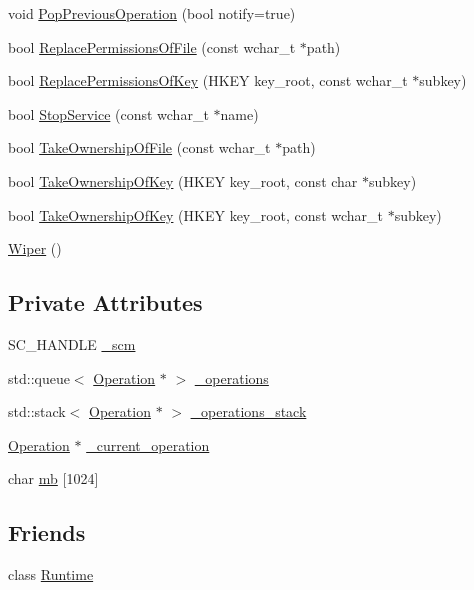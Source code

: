 \begin{DoxyCompactItemize}
void \hyperlink{class_wiper_a00e8df6a911cf4a6680a382e19b44396}{Pop\-Previous\-Operation} (bool notify=true)
\item 
bool \hyperlink{class_wiper_adda0b8c48ff6a104deacd17ae11ecd81}{Replace\-Permissions\-Of\-File} (const wchar\-\_\-t $\ast$path)
\item 
bool \hyperlink{class_wiper_a96dff12b4ab8a075098e08e7f21e4357}{Replace\-Permissions\-Of\-Key} (H\-K\-E\-Y key\-\_\-root, const wchar\-\_\-t $\ast$subkey)
\item 
bool \hyperlink{class_wiper_a6dcb5ad961fe3403cde2783a75460172}{Stop\-Service} (const wchar\-\_\-t $\ast$name)
\item 
bool \hyperlink{class_wiper_a044fdff304d6e27ecd8643c89e99f234}{Take\-Ownership\-Of\-File} (const wchar\-\_\-t $\ast$path)
\item 
bool \hyperlink{class_wiper_aa6d779022f6b2b4d06734f089a82e46e}{Take\-Ownership\-Of\-Key} (H\-K\-E\-Y key\-\_\-root, const char $\ast$subkey)
\item 
bool \hyperlink{class_wiper_a27e7a3905abc6414d2d1f180e8f3844b}{Take\-Ownership\-Of\-Key} (H\-K\-E\-Y key\-\_\-root, const wchar\-\_\-t $\ast$subkey)
\item 
\hyperlink{class_wiper_a99987a7b4100b4781fb825f238facf17}{Wiper} ()
\end{DoxyCompactItemize}
\subsection*{Private Attributes}
\begin{DoxyCompactItemize}
\item 
S\-C\-\_\-\-H\-A\-N\-D\-L\-E \hyperlink{class_wiper_aa14de868e468e980872140bd970eb3e5}{\-\_\-scm}
\item 
std\-::queue$<$ \hyperlink{class_operation}{Operation} $\ast$ $>$ \hyperlink{class_wiper_a2ac92738b2626a47eecff22843e1ccd3}{\-\_\-operations}
\item 
std\-::stack$<$ \hyperlink{class_operation}{Operation} $\ast$ $>$ \hyperlink{class_wiper_a98e266ae56c41c58c0d21ce30064d684}{\-\_\-operations\-\_\-stack}
\item 
\hyperlink{class_operation}{Operation} $\ast$ \hyperlink{class_wiper_a98c5b4449bd30c40d0ead348c57f0f7f}{\-\_\-current\-\_\-operation}
\item 
char \hyperlink{class_wiper_a112d278ddc1fdca0a552bab45568a965}{mb} \mbox{[}1024\mbox{]}
\end{DoxyCompactItemize}
\subsection*{Friends}
\begin{DoxyCompactItemize}
\item 
class \hyperlink{class_wiper_af3d14e26ba8af9e6cc5a32aad8446de7}{Runtime}
\end{DoxyCompactItemize}
